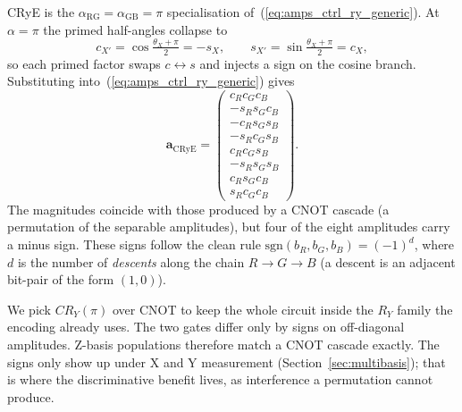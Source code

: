 \documentclass[conference,compsoc]{IEEEtran}
\begin{document}
CRyE is the $\alpha_\text{RG} = \alpha_\text{GB} = \pi$ specialisation of~(\ref{eq:amps_ctrl_ry_generic}).
At $\alpha = \pi$ the primed half-angles collapse to
\[
c_{X'} = \cos\tfrac{\theta_X + \pi}{2} = -s_X, \qquad s_{X'} = \sin\tfrac{\theta_X + \pi}{2} = c_X,
\]
so each primed factor swaps $c\leftrightarrow s$ and injects a sign on the cosine branch.
Substituting into~(\ref{eq:amps_ctrl_ry_generic}) gives
\begin{equation}
    \mathbf{a}_\text{CRyE} = \begin{pmatrix} c_R c_G c_B \\ -s_R s_G c_B \\ -c_R s_G s_B \\ -s_R c_G s_B \\ c_R c_G s_B \\ -s_R s_G s_B \\ c_R s_G c_B \\ s_R c_G c_B \end{pmatrix}.
    \label{eq:amps_crye}
\end{equation}
The magnitudes coincide with those produced by a CNOT cascade (a permutation of the separable amplitudes), but four of the eight amplitudes carry a minus sign.
These signs follow the clean rule $\text{sgn}(b_R, b_G, b_B) = (-1)^{d}$, where $d$ is the number of \emph{descents} along the chain $R \to G \to B$ (a descent is an adjacent bit-pair of the form $(1,0)$).

We pick $CR_Y(\pi)$ over CNOT to keep the whole circuit inside the $R_Y$ family the encoding already uses. The two gates differ only by signs on off-diagonal amplitudes. Z-basis populations therefore match a CNOT cascade exactly. The signs only show up under X and Y measurement (Section~\ref{sec:multibasis}); that is where the discriminative benefit lives, as interference a permutation cannot produce.
\end{document}
